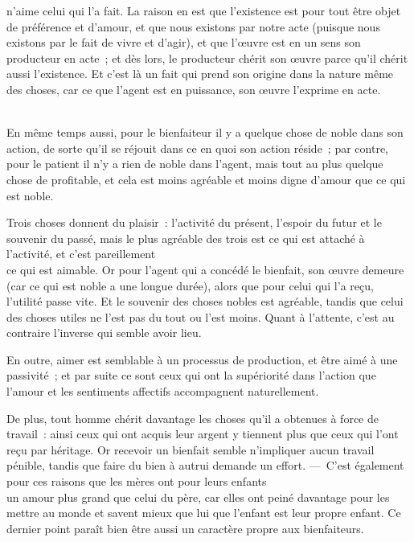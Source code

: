 \documentclass[french,twoside]{book} %
\begin{document}
n’aime celui qui l’a fait. La raison en est que l’existence est pour tout être objet de préférence et d’amour, et que nous existons par notre acte (puisque nous existons par le fait de vivre et d’agir), et que l’œuvre est en un sens son producteur en acte ; et dès lors, le producteur chérit son œuvre parce qu’il chérit aussi l’existence. Et c’est là un fait qui prend son origine dans la nature même des choses, car ce que l’agent est en puissance, son œuvre l’exprime en acte.\par
\\
En même temps aussi, pour le bienfaiteur il y a quelque chose de noble dans son action, de sorte qu’il se réjouit dans ce en quoi son action réside ; par contre, pour le patient il n’y a rien de noble dans l’agent, mais tout au plus quelque chose de profitable, et cela est moins agréable et moins digne d’amour que ce qui est noble.\par
Trois choses donnent du plaisir : l’activité du présent, l’espoir du futur et le souvenir du passé, mais le plus agréable des trois est ce qui est attaché à l’activité, et c’est pareillement \\
ce qui est aimable. Or pour l’agent qui a concédé le bienfait, son œuvre demeure (car ce qui est noble a une longue durée), alors que pour celui qui l’a reçu, l’utilité passe vite. Et le souvenir des choses nobles est agréable, tandis que celui des choses utiles ne l’est pas du tout ou l’est moins. Quant à l’attente, c’est au contraire l’inverse qui semble avoir lieu. \\
\par
En outre, aimer est semblable à un processus de production, et être aimé à une passivité ; et par suite ce sont ceux qui ont la supériorité dans l’action que l’amour et les sentiments affectifs accompagnent naturellement.\par
De plus, tout homme chérit davantage les choses qu’il a obtenues à force de travail : ainsi ceux qui ont acquis leur argent y tiennent plus que ceux qui l’ont reçu par héritage. Or recevoir un bienfait semble n’impliquer aucun travail pénible, tandis que faire du bien à autrui demande un effort. — C’est également pour ces raisons que les mères ont pour leurs enfants \\
un amour plus grand que celui du père, car elles ont peiné davantage pour les mettre au monde et savent mieux que lui que l’enfant est leur propre enfant. Ce dernier point paraît bien être aussi un caractère propre aux bienfaiteurs.
\end{document}
